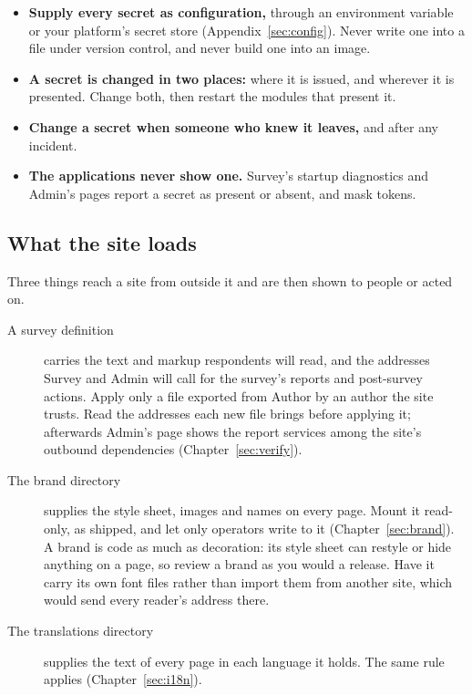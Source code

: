 \documentclass[11pt, a4paper]{article}
\begin{document}
\begin{itemize}
  \item \textbf{Supply every secret as configuration,} through an environment variable or
        your platform's secret store (Appendix~\ref{sec:config}). Never write one into a file
        under version control, and never build one into an image.
  \item \textbf{A secret is changed in two places:} where it is issued, and wherever it is
        presented. Change both, then restart the modules that present it.
  \item \textbf{Change a secret when someone who knew it leaves,} and after any incident.
  \item \textbf{The applications never show one.} Survey's startup diagnostics and Admin's
         pages report a secret as present or absent, and mask tokens.
\end{itemize}

\subsection{What the site loads}
\label{sec:security-content}

Three things reach a site from outside it and are then shown to people or acted on.

\begin{description}
  \item[A survey definition] carries the text and markup respondents will read, and the
        addresses Survey and Admin will call for the survey's reports and post-survey actions.
        Apply only a file exported from Author by an author the site trusts. Read the
        addresses each new file brings before applying it; afterwards Admin's
         page shows the report services among the site's outbound
        dependencies (Chapter~\ref{sec:verify}).
  \item[The brand directory] supplies the style sheet, images and names on every page. Mount
        it read-only, as shipped, and let only operators write to it
        (Chapter~\ref{sec:brand}). A brand is code as much as decoration: its style sheet can
        restyle or hide anything on a page, so review a brand as you would a release. Have it
        carry its own font files rather than import them from another site, which would send
        every reader's address there.
  \item[The translations directory] supplies the text of every page in each language it
        holds. The same rule applies (Chapter~\ref{sec:i18n}).
\end{description}
\end{document}
